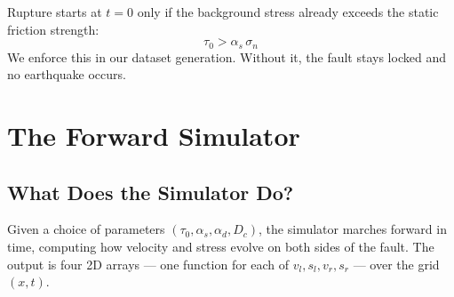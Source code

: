 \documentclass[12pt, a4paper]{article}
\theoremstyle{definition}
\begin{document}
\begin{tcolorbox}[highlight=myblue, title=Rupture Nucleation Condition]
  Rupture starts at $t=0$ only if the background stress already exceeds the
  static friction strength:
  \[
    \tau_0 > \alpha_s\,\sigma_n
  \]
  We enforce this in our dataset generation.  Without it, the fault stays
  locked and no earthquake occurs.
\end{tcolorbox}

\section{The Forward Simulator}
\label{sec:simulator}

\subsection{What Does the Simulator Do?}

Given a choice of parameters $(\tau_0, \alpha_s, \alpha_d, D_c)$, the simulator
marches forward in time, computing how velocity and stress evolve on both sides
of the fault.  The output is four 2D arrays — one function for each of
$v_l, s_l, v_r, s_r$ — over the grid $(x, t)$.
\end{document}
